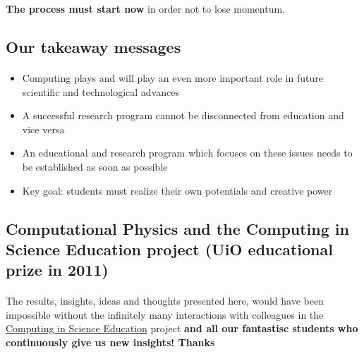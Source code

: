 \documentclass[%
twoside,                 %
final,                   %
10pt]{article}
\begin{document}
\noindent



\textbf{The process must start now} in order not to lose momentum.



\subsection*{Our takeaway messages}

\paragraph{}
\begin{itemize}
\item Computing plays and will play an even more important role in future scientific and technological advances

\item A successful research program cannot be disconnected from education and vice versa

\item An educational and research program which focuses on these issues needs to be established as soon as possible

\item Key goal: students must realize their own potentials and creative power
\end{itemize}

\noindent




\subsection*{Computational Physics and  the Computing in Science Education project (UiO educational prize in 2011)}


\paragraph{}
The results, insights, ideas and thoughts presented here, would have been impossible without the infinitely many  interactions with colleagues in the \href{{http://www.mn.uio.no/english/about/collaboration/cse/}}{Computing in Science Education} project \textbf{and all our fantastisc students who continuously give us new insights! Thanks}
\end{document}
